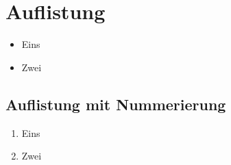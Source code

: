 \documentclass[a4paper, 10pt, fleqn]{article}
\begin{document}
\section{Auflistung}
\begin{itemize}
    \item Eins
    \item Zwei
\end{itemize}
\subsection{Auflistung mit Nummerierung}
\begin{enumerate}
    \item Eins
    \item Zwei
\end{enumerate}
\end{document}
